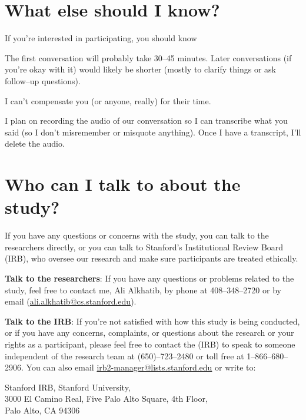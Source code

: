 \documentclass[11pt]{article}
\newcommand{\contact}[1]{{\color{red}#1}}
\begin{document}
\section*{What else should I know?}
If you're interested in participating, you should know
\begin{compactitem}
  \item The first conversation will probably take 30--45 minutes.
        Later conversations (if you're okay with it) would likely be shorter
        (mostly to clarify things or ask follow--up questions).
  \item I can't compensate you (or anyone, really) for their time.
  \item I plan on recording the audio of our conversation
        so I can transcribe what you said
        (so I don't misremember or misquote anything).
        Once I have a transcript, I'll delete the audio.
\end{compactitem}

\section*{Who can I talk to about the study?}
If you have any questions or concerns with the study,
you can talk to the researchers directly, or
you can talk to Stanford's Institutional Review Board (IRB),
who oversee our research and make sure participants are treated ethically.

\textbf{Talk to the researchers}:
If you have any questions or problems related to the study,
feel free to contact me, \contact{Ali Alkhatib},
by phone at \contact{408--348--2720} or
by email (\contact{\url{ali.alkhatib@cs.stanford.edu}}).

\textbf{Talk to the IRB}:
If you're not satisfied with how this study is being conducted, or
if you have any concerns, complaints, or
questions about the research or
your rights as a participant, please feel free to contact the
(IRB) to speak to someone independent of the research team at
\contact{(650)--723--2480} or
toll free at \contact{1--866--680--2906}.
You can also email \url{irb2-manager@lists.stanford.edu} or
write to:

\begin{center}\contact{Stanford IRB, Stanford University,\\
         3000 El Camino Real, Five Palo Alto Square, 4th Floor,\\
         Palo Alto, CA 94306}\end{center}
\end{document}
